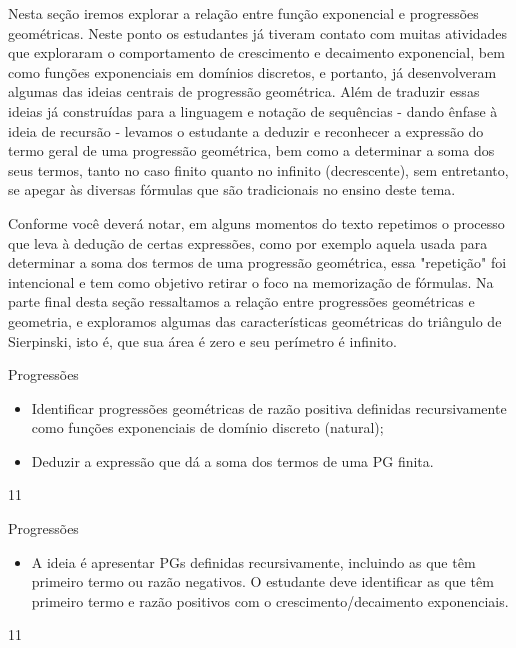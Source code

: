 \cleardoublepage
\def\currentcolor{session1}
\begin{texto}
{
Nesta seção iremos explorar a relação entre função exponencial e progressões geométricas. Neste ponto os estudantes já tiveram contato com muitas atividades que exploraram o comportamento de crescimento e decaimento exponencial, bem como funções exponenciais em domínios discretos, e portanto, já desenvolveram algumas das ideias centrais de progressão geométrica. Além de traduzir essas ideias já construídas para a linguagem e notação de sequências - dando ênfase à ideia de recursão - levamos o estudante a deduzir e reconhecer a expressão do termo geral de uma progressão geométrica, bem como a determinar a soma dos seus termos, tanto no caso finito quanto no infinito (decrescente), sem entretanto, se apegar às diversas fórmulas que são tradicionais no ensino deste tema.

Conforme você deverá notar, em alguns momentos do texto repetimos o processo que leva à dedução de certas expressões, como por exemplo aquela usada para determinar a soma dos termos de uma progressão geométrica, essa "repetição" foi intencional e tem como objetivo retirar o foco na memorização de fórmulas. Na parte final desta seção ressaltamos a relação entre progressões geométricas e geometria, e exploramos algumas das características geométricas do triângulo de Sierpinski, isto é, que sua área é zero e seu perímetro é infinito.
}
\end{texto}
\begin{objectives}{Progressões}
{
\begin{itemize}
\item Identificar progressões geométricas de razão positiva definidas recursivamente como funções exponenciais de domínio discreto (natural);
\end{itemize}


\begin{itemize}
\item Deduzir a expressão que dá a soma dos termos de uma PG finita.
\end{itemize}
}{1}{1}
\end{objectives}
\begin{sugestions}{Progressões}
{
\begin{itemize}

\item A ideia é apresentar PGs definidas recursivamente, incluindo as que têm primeiro termo ou razão negativos. O estudante deve identificar as que têm primeiro termo e razão positivos com o crescimento/decaimento exponenciais.

\end{itemize}
}{1}{1}
\end{sugestions}
